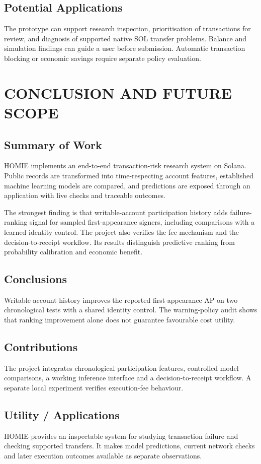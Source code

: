 \documentclass[12pt,a4paper,oneside]{report}
\begin{document}
\section{Potential Applications}
The prototype can support research inspection, prioritisation of transactions for review, and diagnosis of supported native SOL transfer problems. Balance and simulation findings can guide a user before submission. Automatic transaction blocking or economic savings require separate policy evaluation.

\chapter{CONCLUSION AND FUTURE SCOPE}
\section{Summary of Work}
HOMIE implements an end-to-end transaction-risk research system on Solana. Public records are transformed into time-respecting account features, established machine learning models are compared, and predictions are exposed through an application with live checks and traceable outcomes.

The strongest finding is that writable-account participation history adds failure-ranking signal for sampled first-appearance signers, including comparisons with a learned identity control. The project also verifies the fee mechanism and the decision-to-receipt workflow. Its results distinguish predictive ranking from probability calibration and economic benefit.

\section{Conclusions}
Writable-account history improves the reported first-appearance AP on two chronological tests with a shared identity control. The warning-policy audit shows that ranking improvement alone does not guarantee favourable cost utility.

\section{Contributions}
The project integrates chronological participation features, controlled model comparisons, a working inference interface and a decision-to-receipt workflow. A separate local experiment verifies execution-fee behaviour.

\section{Utility / Applications}
HOMIE provides an inspectable system for studying transaction failure and checking supported transfers. It makes model predictions, current network checks and later execution outcomes available as separate observations.
\end{document}
